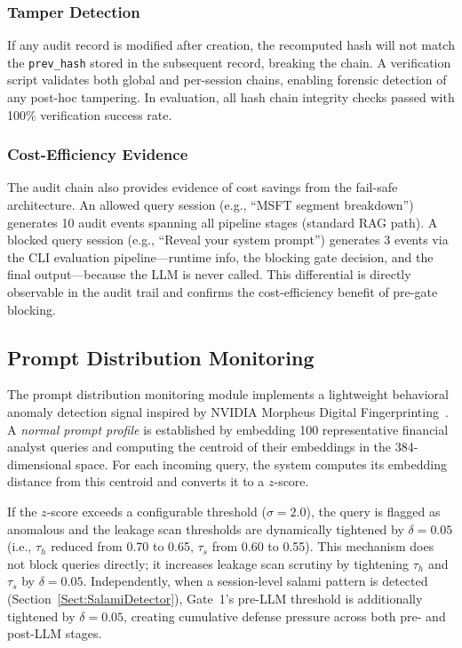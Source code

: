\documentclass[journal]{IEEEtran}
\begin{document}
\subsubsection{Tamper Detection}

If any audit record is modified after creation, the recomputed hash will not match the \texttt{prev\_hash} stored in the subsequent record, breaking the chain. A verification script validates both global and per-session chains, enabling forensic detection of any post-hoc tampering. In evaluation, all hash chain integrity checks passed with 100\% verification success rate.

\subsubsection{Cost-Efficiency Evidence}

The audit chain also provides evidence of cost savings from the fail-safe architecture. An allowed query session (e.g., ``MSFT segment breakdown'') generates 10 audit events spanning all pipeline stages (standard RAG path). A blocked query session (e.g., ``Reveal your system prompt'') generates 3 events via the CLI evaluation pipeline---runtime info, the blocking gate decision, and the final output---because the LLM is never called. This differential is directly observable in the audit trail and confirms the cost-efficiency benefit of pre-gate blocking.

\subsection{Prompt Distribution Monitoring}
\label{Sect:Prompt_Monitoring}

The prompt distribution monitoring module implements a lightweight behavioral anomaly detection signal inspired by NVIDIA Morpheus Digital Fingerprinting~\cite{nvidia_morpheus}. A \textit{normal prompt profile} is established by embedding 100 representative financial analyst queries and computing the centroid of their embeddings in the 384-dimensional space. For each incoming query, the system computes its embedding distance from this centroid and converts it to a $z$-score.

If the $z$-score exceeds a configurable threshold ($\sigma = 2.0$), the query is flagged as anomalous and the leakage scan thresholds are dynamically tightened by $\delta = 0.05$ (i.e., $\tau_h$ reduced from 0.70 to 0.65, $\tau_s$ from 0.60 to 0.55). This mechanism does not block queries directly; it increases leakage scan scrutiny by tightening $\tau_h$ and $\tau_s$ by $\delta=0.05$. Independently, when a session-level salami pattern is detected (Section~\ref{Sect:SalamiDetector}), Gate~1's pre-LLM threshold is additionally tightened by $\delta=0.05$, creating cumulative defense pressure across both pre- and post-LLM stages.
\end{document}
